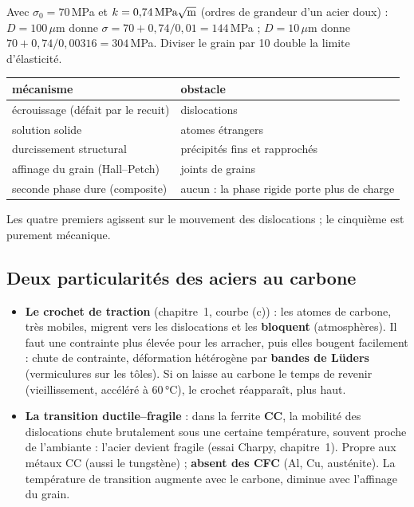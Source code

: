 \begin{exbox}[title={Exemple chiffré (pas dans les diapositives)}]
Avec $\sigma_0 = 70$\,MPa et $k = 0{,}74\,\text{MPa}\sqrt{\text m}$ (ordres de grandeur d'un
acier doux) : $D = 100\,\mu$m donne $\sigma = 70 + 0{,}74/0{,}01 = 144$\,MPa ; $D = 10\,\mu$m donne
$70 + 0{,}74/0{,}00316 = 304$\,MPa. Diviser le grain par 10 double la limite d'élasticité.
\end{exbox}

\begin{keybox}[title=Les cinq mécanismes de durcissement des métaux]
\begin{center}
\renewcommand{\arraystretch}{1.3}
\begin{tabular}{l|l}
mécanisme & obstacle \\ \hline
écrouissage (défait par le recuit) & dislocations \\
solution solide & atomes étrangers \\
durcissement structural & précipités fins et rapprochés \\
affinage du grain (Hall--Petch) & joints de grains \\
seconde phase dure (composite) & aucun : la phase rigide porte plus de charge \\
\end{tabular}
\end{center}
Les quatre premiers agissent sur le mouvement des dislocations ; le cinquième est purement
mécanique.
\end{keybox}

\subsection*{Deux particularités des aciers au carbone}

\begin{itemize}
  \item \textbf{Le crochet de traction} (chapitre~1, courbe (c)) : les atomes de carbone, très
        mobiles, migrent vers les dislocations et les \textbf{bloquent} (\og atmosphères\fg{}). Il
        faut une contrainte plus élevée pour les arracher, puis elles bougent facilement : chute de
        contrainte, déformation hétérogène par \textbf{bandes de Lüders} (\og vermiculures\fg{}
        sur les tôles). Si on laisse au carbone le temps de revenir (vieillissement, accéléré à
        60\,°C), le crochet réapparaît, plus haut.
  \item \textbf{La transition ductile--fragile} : dans la ferrite \textbf{CC}, la mobilité des
        dislocations chute brutalement sous une certaine température, souvent proche de
        l'ambiante : l'acier devient fragile (essai Charpy, chapitre~1). Propre aux métaux CC
        (aussi le tungstène) ; \textbf{absent des CFC} (Al, Cu, austénite). La température de
        transition augmente avec le carbone, diminue avec l'affinage du grain.
\end{itemize}

